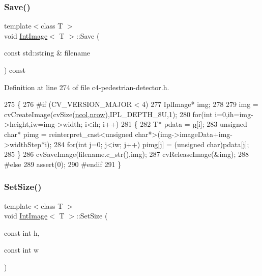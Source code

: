 \subsubsection{\texorpdfstring{Save()}{Save()}}
{\footnotesize\ttfamily template$<$class T $>$ \\
void \mbox{\hyperlink{class_int_image}{Int\+Image}}$<$ T $>$\+::Save (\begin{DoxyParamCaption}\item[{const std\+::string \&}]{filename }\end{DoxyParamCaption}) const}



Definition at line 274 of file c4-\/pedestrian-\/detector.\+h.


\begin{DoxyCode}
275 \{
276 \textcolor{preprocessor}{#if (CV\_VERSION\_MAJOR < 4)}
277     IplImage* img;
278 
279     img = cvCreateImage(cvSize(\mbox{\hyperlink{class_array2d_c_a27e0f8f40f644831cd7c750db59dc28a}{ncol}},\mbox{\hyperlink{class_array2d_c_a12f690f7195f7674a86a7e1eedbc473c}{nrow}}),IPL\_DEPTH\_8U,1);
280     \textcolor{keywordflow}{for}(\textcolor{keywordtype}{int} i=0,ih=img->height,iw=img->width; i<ih; i++)
281     \{
282         T* pdata = \mbox{\hyperlink{class_array2d_c_a727eae5d663d463635cc150e6f771f0d}{p}}[i];
283         \textcolor{keywordtype}{unsigned} \textcolor{keywordtype}{char}* pimg = \textcolor{keyword}{reinterpret\_cast<}\textcolor{keywordtype}{unsigned} \textcolor{keywordtype}{char}*\textcolor{keyword}{>}(img->imageData+img->widthStep*i);
284         \textcolor{keywordflow}{for}(\textcolor{keywordtype}{int} j=0; j<iw; j++) pimg[j] = (\textcolor{keywordtype}{unsigned} \textcolor{keywordtype}{char})pdata[j];
285     \}
286     cvSaveImage(filename.c\_str(),img);
287     cvReleaseImage(&img);
288 \textcolor{preprocessor}{#else}
289     assert(0);
290 \textcolor{preprocessor}{#endif}
291 \}
\end{DoxyCode}
\mbox{\label{class_int_image_a89eb8fac3fde8d3ce392e5f28c14f8b0}} 
\subsubsection{\texorpdfstring{Set\+Size()}{SetSize()}}
{\footnotesize\ttfamily template$<$class T $>$ \\
void \mbox{\hyperlink{class_int_image}{Int\+Image}}$<$ T $>$\+::Set\+Size (\begin{DoxyParamCaption}\item[{const int}]{h,  }\item[{const int}]{w }\end{DoxyParamCaption})\hspace{0.3cm}{\ttfamily [inline]}}



